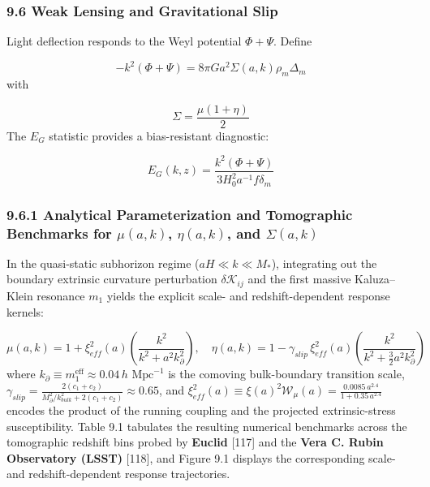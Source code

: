 \documentclass[aps,prd,onecolumn,superscriptaddress,nofootinbib,longbibliography,10pt]{revtex4-2}
\begin{document}
  
\subsubsection*{9.6 Weak Lensing and Gravitational Slip}

  Light deflection responds to the Weyl potential \(\Phi + \Psi\). Define


  \[ -k^2(\Phi + \Psi) = 8\pi G a^2 \Sigma(a,k)\rho_m \Delta_m \]
  with


  \[ \Sigma = \frac{\mu(1 + \eta)}{2} \]
  The \(E_G\) statistic provides a bias-resistant diagnostic:


  \[ E_G(k,z) = \frac{k^2(\Phi + \Psi)}{3H_0^2 a^{-1} f \delta_m} \]

  
\subsubsection*{9.6.1 Analytical Parameterization and Tomographic Benchmarks for \(\mu(a,k)\), \(\eta(a,k)\), and \(\Sigma(a,k)\)}

  In the quasi-static subhorizon regime (\(aH \ll k \ll M_*\)), integrating out the boundary extrinsic curvature perturbation \(\delta\mathcal{K}_{ij}\) and the first massive Kaluza–Klein resonance \(m_1\) yields the explicit scale- and redshift-dependent response kernels:


  \[ \mu(a,k) = 1 + \xi_{eff}^2(a)\left(\frac{k^2}{k^2 + a^2 k_\partial^2}\right), \quad \eta(a,k) = 1 - \gamma_{slip}\,\xi_{eff}^2(a)\left(\frac{k^2}{k^2 + \frac{3}{2}a^2 k_\partial^2}\right) \]
  where \(k_\partial \equiv m_1^{\text{eff}} \approx 0.04\,h\text{ Mpc}^{-1}\) is the comoving bulk-boundary transition scale, \(\gamma_{slip} = \frac{2(c_1+c_2)}{M_\partial^2/k_{bulk}^2 + 2(c_1+c_2)} \approx 0.65\), and \(\xi_{eff}^2(a) \equiv \xi(a)^2 \mathcal{W}_\mu(a) = \frac{0.0085\,a^{2.4}}{1 + 0.35\,a^{2.4}}\) encodes the product of the running coupling and the projected extrinsic-stress susceptibility. Table 9.1 tabulates the resulting numerical benchmarks across the tomographic redshift bins probed by \textbf{Euclid} [117] and the \textbf{Vera C. Rubin Observatory (LSST)} [118], and Figure 9.1 displays the corresponding scale- and redshift-dependent response trajectories.
\end{document}
